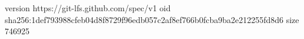 version https://git-lfs.github.com/spec/v1
oid sha256:1def793988cfeb04d8f8729f96edb057c2af8ef766b0fcba9ba2e212255fd8d6
size 746925
